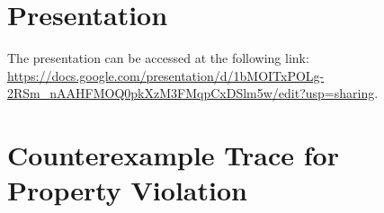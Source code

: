 \documentclass{article}
\begin{document}
\section{Presentation}
The presentation can be accessed at the following link: \url{https://docs.google.com/presentation/d/1bMOITxPOLg-2RSm_nAAHFMOQ0pkXzM3FMqpCxDSlm5w/edit?usp=sharing}.




\appendix
\section{Counterexample Trace for Property Violation}
\label{appendix:trace}

\end{document}
